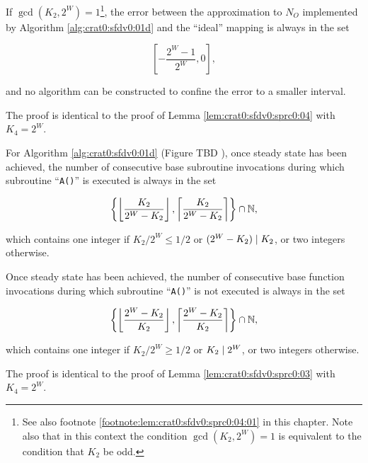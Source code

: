 \begin{vworklemmastatement}
\label{lem:crat0:sfdv0:sprx1:03}
If $\gcd(K_2, 2^W)=1$\footnote{See also footnote \ref{footnote:lem:crat0:sfdv0:sprc0:04:01}
in this chapter.  Note also that in this context the condition $\gcd(K_2, 2^W)=1$ 
is equivalent to the condition that $K_2$ be odd.}, the error between
the approximation to $N_O$ implemented by Algorithm \ref{alg:crat0:sfdv0:01d} 
and the ``ideal'' mapping is always
in the set

\begin{equation}
\label{eq:lem:crat0:sfdv0:sprx1:03:01}
\left[ - \frac{2^W - 1}{2^W} , 0 \right] ,
\end{equation}

and no algorithm can be constructed to 
confine the error to a smaller interval.
\end{vworklemmastatement}
\begin{vworklemmaproof}
The proof is identical to the proof of Lemma 
\ref{lem:crat0:sfdv0:sprc0:04} with $K_4 = 2^W$.
\end{vworklemmaproof}

\begin{vworklemmastatement}
\label{lem:crat0:sfdv0:sprx1:04}
For Algorithm \ref{alg:crat0:sfdv0:01d}
(Figure TBD
), once steady
state has been achieved, the number of consecutive
base subroutine invocations during which subroutine
``\texttt{A()}'' is executed is always in the set

\begin{equation}
\label{eq:lem:crat0:sfdv0:sprx1:04:01}
\left\{
\left\lfloor \frac{K_2}{2^W - K_2} \right\rfloor ,
\left\lceil  \frac{K_2}{2^W - K_2} \right\rceil
\right\} \cap {\mathbb{N}},
\end{equation}

which contains one integer if $K_2/2^W \leq 1/2$ or $(2^W-K_2) \mid K_2$, 
or two integers otherwise.

Once steady state has been achieved, the number of
consecutive base function invocations during which
subroutine ``\texttt{A()}'' is not executed is
always in the set

\begin{equation}
\label{eq:lem:crat0:sfdv0:sprx1:04:02}
\left\{
\left\lfloor \frac{2^W-K_2}{K_2} \right\rfloor ,
\left\lceil  \frac{2^W-K_2}{K_2} \right\rceil
\right\} \cap {\mathbb{N}},
\end{equation}

which contains one integer if $K_2/2^W \geq 1/2$ or $K_2 \mid 2^W$,
or two integers otherwise.
\end{vworklemmastatement}
\begin{vworklemmaproof}
The proof is identical to the proof of Lemma 
\ref{lem:crat0:sfdv0:sprc0:03} with $K_4 = 2^W$.
\end{vworklemmaproof}
\vworklemmafooter{}


